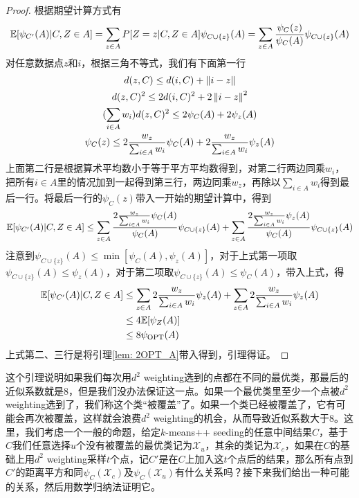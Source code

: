 \begin{proof}
    根据期望计算方式有
    \begin{equation*}
        \mathbb{E}[\psi_{C'}(A)|C,Z \in A] = \sum_{z \in A} P[Z = z|C,Z \in A] \psi_{C\cup\{z\}}(A) = \sum_{z \in A} \frac{\psi_C(z)}{\psi_C(A)} \psi_{C\cup\{z\}}(A)
    \end{equation*}
    对任意数据点$z$和$i$，根据三角不等式，我们有下面第一行
    \begin{gather*}
        d(z,C) \leq d(i,C) + \left\lVert i-z\right\rVert \\
        d(z,C)^2 \leq 2d(i,C)^2 + 2\left\lVert i-z\right\rVert^2 \\
        (\sum_{i \in A} w_i) d(z,C)^2 \leq 2\psi_C(A) + 2\psi_z(A) \\
        \psi_C(z) \leq 2\frac{w_z}{\sum_{i \in A}w_i} \psi_C(A) + 2\frac{w_z}{\sum_{i \in A}w_i} \psi_z(A)
    \end{gather*}
    上面第二行是根据算术平均数小于等于平方平均数得到，对第二行两边同乘$w_i$，把所有$i\in A$里的情况加到一起得到第三行，两边同乘$w_z$，再除以$\sum_{i \in A}w_i$得到最后一行。将最后一行的$\psi_C(z)$带入一开始的期望计算中，得到
    \begin{equation*}
        \mathbb{E}[\psi_{C'}(A)|C,Z \in A] \leq \sum_{z \in A} \frac{2\frac{w_z}{\sum_{i \in A}w_i} \psi_C(A)}{\psi_C(A)} \psi_{C\cup\{z\}}(A) + \sum_{z \in A} \frac{2\frac{w_z}{\sum_{i \in A}w_i} \psi_z(A)}{\psi_C(A)} \psi_{C\cup\{z\}}(A)
    \end{equation*}
    注意到$\psi_{C\cup\{z\}}(A) \leq \min[\psi_C(A),\psi_z(A)]$，对于上式第一项取$\psi_{C\cup\{z\}}(A) \leq \psi_z(A)$，对于第二项取$\psi_{C\cup\{z\}}(A) \leq \psi_C(A)$，带入上式，得
    \begin{align*}
        \mathbb{E}[\psi_{C'}(A)|C,Z \in A] &\leq \sum_{z \in A} 2\frac{w_z}{\sum_{i \in A}w_i} \psi_z(A) + \sum_{z \in A} 2\frac{w_z}{\sum_{i \in A}w_i} \psi_z(A) \\
        &\leq 4 \mathbb{E}[\psi_Z(A)] \\
        &\leq 8 \psi_{\text{OPT}}(A)
    \end{align*}
    上式第二、三行是将引理\ref{lem: 2OPT_A}带入得到，引理得证。
\end{proof}
这个引理说明如果我们每次用$d^2$ weighting选到的点都在不同的最优类，那最后的近似系数就是8，但是我们没办法保证这一点。如果一个最优类里至少一个点被$d^2$ weighting选到了，我们称这个类“被覆盖”了。如果一个类已经被覆盖了，它有可能会再次被覆盖，这样就会浪费$d^2$ weighting的机会，从而导致近似系数大于8。这里，我们考虑一个一般的命题，给定$k$-means++ seeding的任意中间结果$C$，基于$C$我们任意选择$u$个没有被覆盖的最优类记为$\mathcal{X}_u$，其余的类记为$\mathcal{X}_c$，如果在$C$的基础上用$d^2$ weighting采样$t$个点，记$C'$是在$C$上加入这$t$个点后的结果，那么所有点到$C'$的距离平方和同$\psi_C(\mathcal{X}_c)$及$\psi_C(\mathcal{X}_u)$有什么关系吗？接下来我们给出一种可能的关系，然后用数学归纳法证明它。
